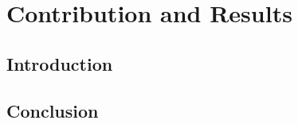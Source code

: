 \chapter{Contribution and Results}
\minitoc
\thispagestyle{empty}
\newpage

\section{Introduction}

\section{Conclusion}

